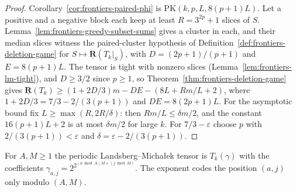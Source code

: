 \begin{proof}
  \leanok
  Corollary~\ref{cor:frontiers-paired-phi} is $\mathrm{PK}(k, p, L, 8(p + 1)L)$. Let a
  positive and a negative block each keep at least $R = 3^{2p} + 1$ slices of $S$.
  Lemma~\ref{lem:frontiers-greedy-subset-sums} gives a cluster in each, and their median
  slices witness the paired-cluster hypothesis of Definition~\ref{def:frontiers-deletion-game}
  for $S \mapsto \underline{\mathbf{R}}(T_k|_S)$, with $D = (2p + 1)/(p + 1)$ and
  $E = 8(p + 1)L$. The tensor is tight with nonzero slices
  (Lemma~\ref{lem:frontiers-lm-tight}), and $D \ge 3/2$ since $p \ge 1$, so
  Theorem~\ref{thm:frontiers-deletion-game} gives
  $\underline{\mathbf{R}}(T_k) \ge (1 + 2D/3)m - DE - (8L + Rm/L + 2)$, where
  $1 + 2D/3 = 7/3 - 2/(3(p + 1))$ and $DE = 8(2p + 1)L$. For the asymptotic bound fix
  $L \ge \max(R, 2R/\delta)$: then $Rm/L \le \delta m/2$, and the constant
  $16(p + 1)L + 2$ is at most $\delta m/2$ for large $k$. For $7/3 - \varepsilon$ choose
  $p$ with $2/(3(p + 1)) < \varepsilon$ and $\delta = \varepsilon - 2/(3(p + 1))$.
\end{proof}

\begin{definition}
  \label{def:frontiers-periodic-lm-tensor}
  \leanok
  For $A, M \ge 1$ the periodic Landsberg--Micha{\l}ek tensor is $T_k(\gamma)$ with the
  coefficients $\gamma_{a, j} = 2^{2^{(a \bmod A) M + (j \bmod M)}}$. The exponent codes the
  position $(a, j)$ only modulo $(A, M)$.
\end{definition}

